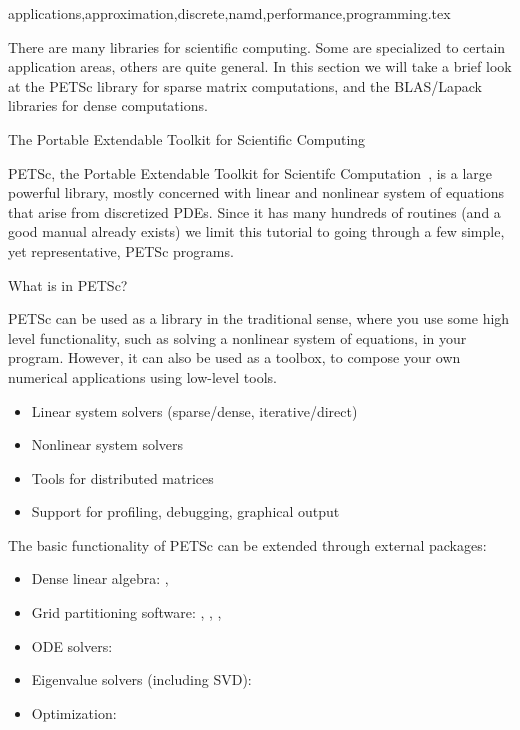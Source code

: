 {applications,approximation,discrete,namd,performance,programming}.tex

There are many libraries for scientific computing. Some are
specialized to certain application areas, others are quite general. In
this section we will take a brief look at the PETSc library for sparse
matrix computations, and the BLAS/Lapack libraries for dense
computations.

 {The Portable Extendable Toolkit for Scientific
  Computing}

PETSc, the Portable Extendable Toolkit for Scientifc
Computation~\cite{}, is a large powerful library, mostly concerned
with linear and nonlinear system of equations that arise from
discretized \acp{PDE}. Since it has many hundreds of routines (and a
good manual already exists) we limit this tutorial to going through
a few simple, yet representative, PETSc programs.

 {What is in PETSc?}

PETSc can be used as a library in the traditional sense, where you use
some high level functionality, such as solving a nonlinear system of
equations, in your program. However, it can also be used as a toolbox,
to compose your own numerical applications using low-level tools.

  \begin{itemize}
  \item Linear system solvers (sparse/dense, iterative/direct)
  \item Nonlinear system solvers
  \item Tools for distributed matrices
  \item Support for profiling, debugging, graphical output
  \end{itemize}

The basic functionality of PETSc can be extended through external
packages:

  \begin{itemize}
  \item Dense linear algebra: , 
  \item Grid partitioning software: , , , 
  \item ODE solvers: 
  \item Eigenvalue solvers (including SVD): 
  \item Optimization: 
  \end{itemize}


